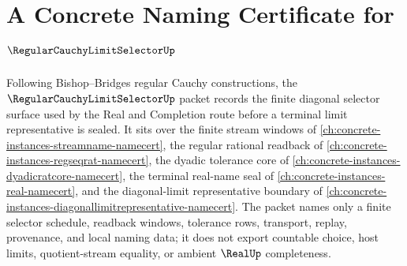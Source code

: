 \chapter{A Concrete Naming Certificate for $\RegularCauchyLimitSelectorUp$}
\label{ch:concrete-instances-regular-cauchy-limit-selector-namecert}

Following Bishop--Bridges regular Cauchy constructions, the $\RegularCauchyLimitSelectorUp$ packet records the finite diagonal selector surface used by the Real and Completion route before a terminal limit representative is sealed. It sits over the finite stream windows of \autoref{ch:concrete-instances-streamname-namecert}, the regular rational readback of \autoref{ch:concrete-instances-regseqrat-namecert}, the dyadic tolerance core of \autoref{ch:concrete-instances-dyadicratcore-namecert}, the terminal real-name seal of \autoref{ch:concrete-instances-real-namecert}, and the diagonal-limit representative boundary of \autoref{ch:concrete-instances-diagonallimitrepresentative-namecert}. The packet names only a finite selector schedule, readback windows, tolerance rows, transport, replay, provenance, and local naming data; it does not export countable choice, host limits, quotient-stream equality, or ambient $\RealUp$ completeness.

